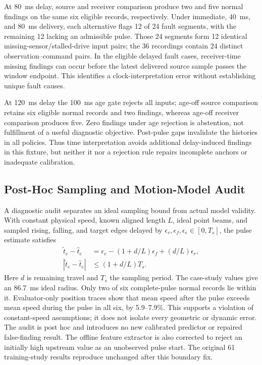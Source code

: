 At 80~ms delay, source and receiver comparison produce two and five normal findings on the same six eligible records, respectively. Under immediate, 40~ms, and 80~ms delivery, each alternative flags 12 of 24 fault segments, with the remaining 12 lacking an admissible pulse. Those 24 segments form 12 identical missing-sensor/stalled-drive input pairs; the 36 recordings contain 24 distinct observation--command pairs. In the eligible delayed fault cases, receiver-time missing findings can occur before the latest delivered source sample passes the window endpoint. This identifies a clock-interpretation error without establishing unique fault causes.

At 120~ms delay the 100~ms age gate rejects all inputs; age-off source comparison retains six eligible normal records and two findings, whereas age-off receiver comparison produces five. Zero findings under age rejection is abstention, not fulfillment of a useful diagnostic objective. Post-pulse gaps invalidate the histories in all policies. Thus time interpretation avoids additional delay-induced findings in this fixture, but neither it nor a rejection rule repairs incomplete anchors or inadequate calibration.

\subsection{Post-Hoc Sampling and Motion-Model Audit}
A diagnostic audit separates an ideal sampling bound from actual model validity. With constant physical speed, known aligned length $L$, ideal point beams, and sampled rising, falling, and target edges delayed by $\epsilon_r,\epsilon_f,\epsilon_e\in[0,T_s]$, the pulse estimate satisfies
\begin{equation}
 \begin{aligned}
 \widetilde t_e-\widehat t_e&=\epsilon_e-(1+d/L)\epsilon_f+(d/L)\epsilon_r,\\
 |\widetilde t_e-\widehat t_e|&\leq(1+d/L)T_s.
 \end{aligned}
\end{equation}
Here $d$ is remaining travel and $T_s$ the sampling period. The case-study values give an 86.7~ms ideal radius. Only two of six complete-pulse normal records lie within it. Evaluator-only position traces show that mean speed after the pulse exceeds mean speed during the pulse in all six, by 5.9--7.9\%. This supports a violation of constant-speed assumptions; it does not isolate every geometric or dynamic error. The audit is post hoc and introduces no new calibrated predictor or repaired false-finding result. The offline feature extractor is also corrected to reject an initially high upstream value as an unobserved pulse start. The original 61 training-study results reproduce unchanged after this boundary fix.

